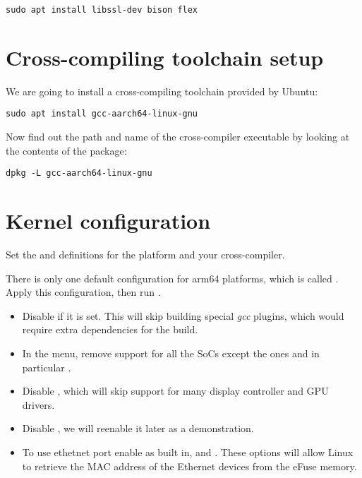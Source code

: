 \begin{verbatim}
sudo apt install libssl-dev bison flex
\end{verbatim}

\section{Cross-compiling toolchain setup}

We are going to install a cross-compiling toolchain provided by Ubuntu:

\begin{verbatim}
sudo apt install gcc-aarch64-linux-gnu
\end{verbatim}

Now find out the path and name of the cross-compiler executable by looking at the contents of the package:

\begin{verbatim}
dpkg -L gcc-aarch64-linux-gnu
\end{verbatim}

\section{Kernel configuration}

Set the  and  definitions for the 
platform and your cross-compiler.

There is only one default configuration for arm64 platforms, which is called
. Apply this configuration, then run .

\begin{itemize}
\item Disable  if it is set. This will skip
  building special {\em gcc} plugins, which would require extra dependencies
  for the build.
\item In the  menu, remove support for all the SoCs
  except the  ones and in particular .
\item Disable , which will skip support for many display
controller and GPU drivers.
\item Disable , we will reenable it later as a demonstration.
\item To use ethetnet port enable as built in,  and .
These options will allow Linux to retrieve the MAC address of the Ethernet devices from the eFuse memory.

\end{itemize}

